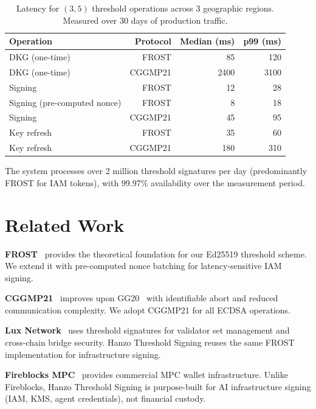 \documentclass[11pt]{article}
\begin{document}
\begin{table}[H]
\centering
\small
\begin{tabular}{lrrr}
\toprule
\textbf{Operation} & \textbf{Protocol} & \textbf{Median (ms)} & \textbf{p99 (ms)} \\
\midrule
DKG (one-time) & FROST & 85 & 120 \\
DKG (one-time) & CGGMP21 & 2400 & 3100 \\
Signing & FROST & 12 & 28 \\
Signing (pre-computed nonce) & FROST & 8 & 18 \\
Signing & CGGMP21 & 45 & 95 \\
Key refresh & FROST & 35 & 60 \\
Key refresh & CGGMP21 & 180 & 310 \\
\bottomrule
\end{tabular}
\caption{Latency for $(3, 5)$ threshold operations across 3 geographic regions.
Measured over 30 days of production traffic.}
\label{tab:perf}
\end{table}

The system processes over 2 million threshold signatures per day (predominantly
FROST for IAM tokens), with 99.97\% availability over the measurement period.

\section{Related Work}
\label{sec:related}

\textbf{FROST}~\cite{frost} provides the theoretical foundation for our Ed25519
threshold scheme. We extend it with pre-computed nonce batching for
latency-sensitive IAM signing.

\textbf{CGGMP21}~\cite{cggmp21} improves upon GG20~\cite{gg20} with
identifiable abort and reduced communication complexity. We adopt CGGMP21 for
all ECDSA operations.

\textbf{Lux Network}~\cite{luxwhitepaper} uses threshold signatures for
validator set management and cross-chain bridge security. Hanzo Threshold
Signing reuses the same FROST implementation for infrastructure signing.

\textbf{Fireblocks MPC}~\cite{fireblocks} provides commercial MPC wallet
infrastructure. Unlike Fireblocks, Hanzo Threshold Signing is purpose-built for
AI infrastructure signing (IAM, KMS, agent credentials), not financial custody.
\end{document}
